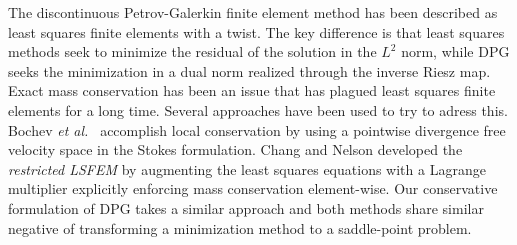 \documentclass[letterpaper]{article}
\def\etal{{\it et al.~}}
\begin{document}
The discontinuous Petrov-Galerkin finite element method has been described as
least squares finite elements with a twist. The key difference is that least
squares methods seek to minimize the residual of the solution in the $L^2$
norm, while DPG seeks the minimization in a dual norm realized through the
inverse Riesz map. Exact mass conservation has been an issue that has plagued
least squares finite elements for a long time. Several approaches have been
used to try to adress this. Bochev \etal\cite{Bochev2010} accomplish local
conservation by using a pointwise divergence free velocity space in the Stokes
formulation.  Chang and Nelson\cite{ChangNelson1997} developed the
\emph{restricted LSFEM}\cite{ChangNelson1997} by augmenting the least squares
equations with a Lagrange multiplier explicitly enforcing mass conservation
element-wise. Our conservative formulation of DPG takes a similar approach and
both methods share similar negative of transforming a minimization method to a
saddle-point problem.
\end{document}
